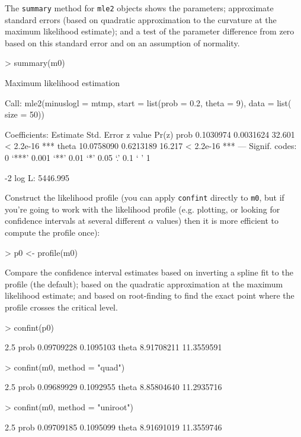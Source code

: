 \documentclass{article}
\newcommand{\code}[1]{{\tt #1}}
\begin{document}
The \code{summary} method for \code{mle2} objects
shows the parameters; approximate standard
errors (based on quadratic approximation to the curvature at
the maximum likelihood estimate); and a test
of the parameter difference from zero based on
this standard error and on an assumption of normality.

\begin{Schunk}
\begin{Sinput}
> summary(m0)
\end{Sinput}
\begin{Soutput}
Maximum likelihood estimation

Call:
mle2(minuslogl = mtmp, start = list(prob = 0.2, theta = 9), data = list(
    size = 50))

Coefficients:
        Estimate Std. Error z value     Pr(z)    
prob   0.1030974  0.0031624  32.601 < 2.2e-16 ***
theta 10.0758090  0.6213189  16.217 < 2.2e-16 ***
---
Signif. codes:  0 ‘***’ 0.001 ‘**’ 0.01 ‘*’ 0.05 ‘.’ 0.1 ‘ ’ 1 

-2 log L: 5446.995 
\end{Soutput}
\end{Schunk}

Construct the likelihood profile (you can
apply \code{confint} directly to \code{m0},
but if you're going to work with the likelihood
profile (e.g. plotting, or looking for confidence
intervals at several different $\alpha$ values)
then it is more efficient to compute the profile
once):

\begin{Schunk}
\begin{Sinput}
> p0 <- profile(m0)
\end{Sinput}
\end{Schunk}

Compare the confidence interval estimates based on
inverting a spline fit to the profile (the default);
based on the quadratic approximation at the
maximum likelihood estimate; and based on
root-finding to find the exact point where the
profile crosses the critical level.

\begin{Schunk}
\begin{Sinput}
> confint(p0)
\end{Sinput}
\begin{Soutput}
           2.5 %
prob  0.09709228  0.1095103
theta 8.91708211 11.3559591
\end{Soutput}
\begin{Sinput}
> confint(m0, method = "quad")
\end{Sinput}
\begin{Soutput}
           2.5 %
prob  0.09689929  0.1092955
theta 8.85804640 11.2935716
\end{Soutput}
\begin{Sinput}
> confint(m0, method = "uniroot")
\end{Sinput}
\begin{Soutput}
           2.5 %
prob  0.09709185  0.1095099
theta 8.91691019 11.3559746
\end{Soutput}
\end{Schunk}
\end{document}
